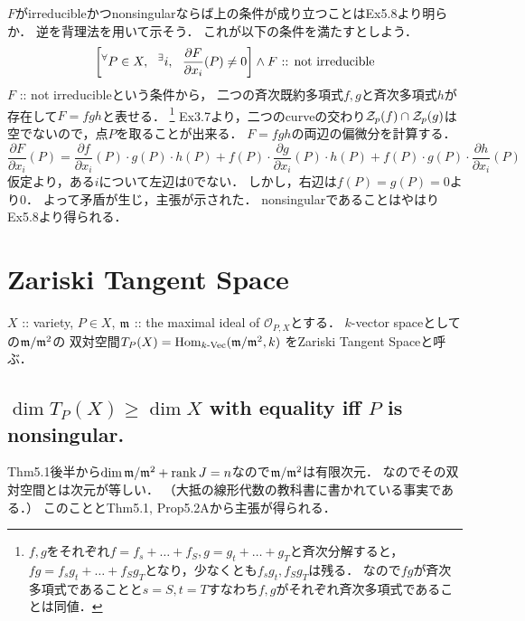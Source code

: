 \documentclass[a4paper]{jsarticle}
\begin{document}
    $F$がirreducibleかつnonsingularならば上の条件が成り立つことはEx5.8より明らか．
    逆を背理法を用いて示そう．
    これが以下の条件を満たすとしよう．
    \[ \left[{}^{\forall} P \in X,~~ {}^{\exists} i,~~ \frac{\partial F}{\partial x_i}(P) \neq 0 \right] \land F\text{ :: not irreducible} \]
    $F$ :: not irreducibleという条件から，
    二つの斉次既約多項式$f,g$と斉次多項式$h$が存在して$F=fgh$と表せる．
	\footnote
	{
		$f,g$をそれぞれ$f=f_s+\dots+f_S, g=g_t+\dots+g_T$と斉次分解すると，
		$fg=f_s g_t+\dots+f_S g_T$となり，少なくとも$f_s g_t, f_S g_T$は残る．
		なので$fg$が斉次多項式であることと$s=S, t=T$すなわち$f,g$がそれぞれ斉次多項式であることは同値．
	}
    Ex3.7より，二つのcurveの交わり$\mathcal{Z}_p(f) \cap \mathcal{Z}_p(g)$は空でないので，点$P$を取ることが出来る．
    $F=fgh$の両辺の偏微分を計算する．
    \[
        \frac{\partial F}{\partial x_i}(P)
        =
        \frac{\partial f}{\partial x_i}(P) \cdot g(P) \cdot h(P)
        +f(P) \cdot \frac{\partial g}{\partial x_i}(P) \cdot h(P)
        +f(P) \cdot g(P) \cdot \frac{\partial h}{\partial x_i}(P)
    \]
    仮定より，ある$i$について左辺は0でない．
    しかし，右辺は$f(P)=g(P)=0$より0．
    よって矛盾が生じ，主張が示された．
    nonsingularであることはやはりEx5.8より得られる．

\section{Zariski Tangent Space} %
    $X$ :: variety, $P \in X$, $\mathfrak{m}$ :: the maximal ideal of $\mathcal{O}_{P,X}$とする．
    $k$-vector spaceとしての$\mathfrak{m}/\mathfrak{m}^2$の
    双対空間$T_P(X)=\operatorname{Hom}_{\text{$k$-Vec}}(\mathfrak{m}/\mathfrak{m}^2, k)$
    をZariski Tangent Spaceと呼ぶ．

    \subsection{$\dim T_P(X) \geq \dim X$ with equality iff $P$ is nonsingular.}
    Thm5.1後半から$\dim \mathfrak{m}/\mathfrak{m}^2+\operatorname{rank} J=n$なので$\mathfrak{m}/\mathfrak{m}^2$は有限次元．
    なのでその双対空間とは次元が等しい．
    （大抵の線形代数の教科書に書かれている事実である．）
    このこととThm5.1, Prop5.2Aから主張が得られる．
\end{document}
